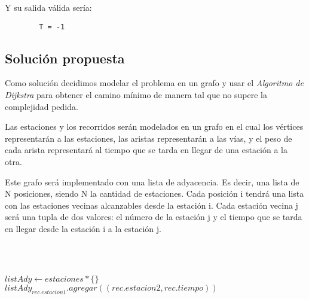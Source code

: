         Y su salida válida sería:

        \begin{verbatim}
        T = -1
        \end{verbatim}


    \subsection{Solución propuesta}
    
    \par Como solución decidimos modelar el problema en un grafo y usar el \emph{Algoritmo de Dijkstra} para obtener el camino mínimo de manera tal que no supere la complejidad pedida.

    \par Las estaciones y los recorridos serán modelados en un grafo en el cual los vértices representarán a las estaciones, las aristas representarán a las vías, y el peso de cada arista representará al tiempo que se tarda en llegar de una estación a la otra.
    \par Este grafo será implementado con una lista de adyacencia. Es decir, una lista de N posiciones, siendo N la cantidad de estaciones. Cada posición i tendrá una lista con las estaciones vecinas alcanzables desde la estación i. Cada estación vecina j será una tupla de dos valores: el número de la estación j y el tiempo que se tarda en llegar desde la estación i a la estación j.
    
     \\~\\
     
    \begin{algorithmic}
    \State {}
        \State $listAdy \gets estaciones * \{\}$ 
         
            \State $listAdy_{rec.estacion1}.agregar((rec.estacion2, rec.tiempo))$ 
        \EndFor
        \State {}
    \EndFunction
    \end{algorithmic}
     
     \\~\\
    
